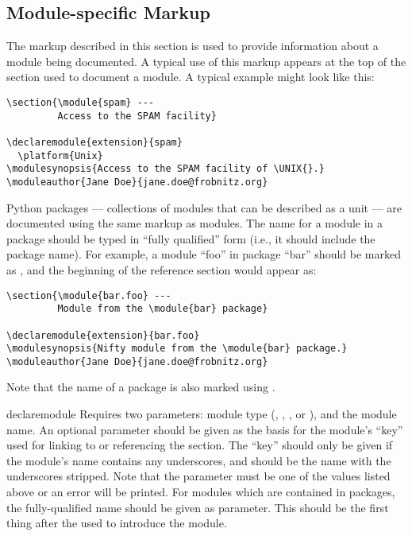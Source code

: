 \documentclass{howto}
\begin{document}
  \subsection{Module-specific Markup}

  The markup described in this section is used to provide information
  about a module being documented.  A typical use of this markup
  appears at the top of the section used to document a module.  A
  typical example might look like this:

\begin{verbatim}
\section{\module{spam} ---
         Access to the SPAM facility}

\declaremodule{extension}{spam}
  \platform{Unix}
\modulesynopsis{Access to the SPAM facility of \UNIX{}.}
\moduleauthor{Jane Doe}{jane.doe@frobnitz.org}
\end{verbatim}

  Python packages --- collections of modules that can
  be described as a unit --- are documented using the same markup as
  modules.  The name for a module in a package should be typed in
  ``fully qualified'' form (i.e., it should include the package name).
  For example, a module ``foo'' in package ``bar'' should be marked as
  , and the beginning of the reference
  section would appear as:

\begin{verbatim}
\section{\module{bar.foo} ---
         Module from the \module{bar} package}

\declaremodule{extension}{bar.foo}
\modulesynopsis{Nifty module from the \module{bar} package.}
\moduleauthor{Jane Doe}{jane.doe@frobnitz.org}
\end{verbatim}

  Note that the name of a package is also marked using
  .

  \begin{macrodesc}{declaremodule}{}
    Requires two parameters: module type (,
    , , or \samp{}), and the module
    name.  An optional parameter should be given as the basis for the
    module's ``key'' used for linking to or referencing the section.
    The ``key'' should only be given if the module's name contains any
    underscores, and should be the name with the underscores stripped.
    Note that the  parameter must be one of the values
    listed above or an error will be printed.  For modules which are
    contained in packages, the fully-qualified name should be given as
     parameter.  This should be the first thing after the
     used to introduce the module.
  \end{macrodesc}
\end{document}
